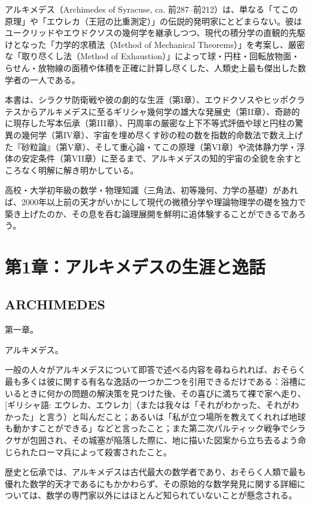 \documentclass[a4paper,11pt,openany]{ltjsbook}
\begin{document}
アルキメデス（Archimedes of Syracuse, ca. 前287--前212）は、単なる「てこの原理」や「エウレカ（王冠の比重測定）」の伝説的発明家にとどまらない。彼はユークリッドやエウドクソスの幾何学を継承しつつ、現代の積分学の直観的先駆けとなった「力学的求積法（Method of Mechanical Theorems）」を考案し、厳密な「取り尽くし法（Method of Exhaustion）」によって球・円柱・回転放物面・らせん・放物線の面積や体積を正確に計算し尽くした、人類史上最も傑出した数学者の一人である。

本書は、シラクサ防衛戦や彼の劇的な生涯（第I章）、エウドクソスやヒッポクラテスからアルキメデスに至るギリシャ幾何学の雄大な発展史（第II章）、奇跡的に現存した写本伝承（第III章）、円周率の厳密な上下不等式評価や球と円柱の驚異の幾何学（第IV章）、宇宙を埋め尽くす砂の粒の数を指数的命数法で数え上げた『砂粒論』（第V章）、そして重心論・てこの原理（第VI章）や流体静力学・浮体の安定条件（第VII章）に至るまで、アルキメデスの知的宇宙の全貌を余すところなく明解に解き明かしている。

高校・大学初年級の数学・物理知識（三角法、初等幾何、力学の基礎）があれば、2000年以上前の天才がいかにして現代の微積分学や理論物理学の礎を独力で築き上げたのか、その息を呑む論理展開を鮮明に追体験することができるであろう。

\clearpage
\mainmatter
\chapter{第1章：アルキメデスの生涯と逸話}
\section*{ARCHIMEDES}

第一章。

アルキメデス。

一般の人々がアルキメデスについて即答で述べる内容を尋ねられれば、おそらく最も多くは彼に関する有名な逸話の一つか二つを引用できるだけである：浴槽にいるときに何かの問題の解決策を見つけた後、その喜びに満ちて裸で家へ走り、[ギリシャ語: エウレカ、エウレカ]（または我々は「それがわかった、それがわかった」と言う）と叫んだこと；あるいは「私が立つ場所を教えてくれれば地球も動かすことができる」などと言ったこと；また第二次パルティック戦争でシラクサが包囲され、その城塞が陥落した際に、地に描いた図案から立ち去るよう命じられたローマ兵によって殺害されたこと。

歴史と伝承では、アルキメデスは古代最大の数学者であり、おそらく人類で最も優れた数学的天才であるにもかかわらず、その原始的な数学発見に関する詳細については、数学の専門家以外にはほとんど知られていないことが懸念される。
\end{document}
